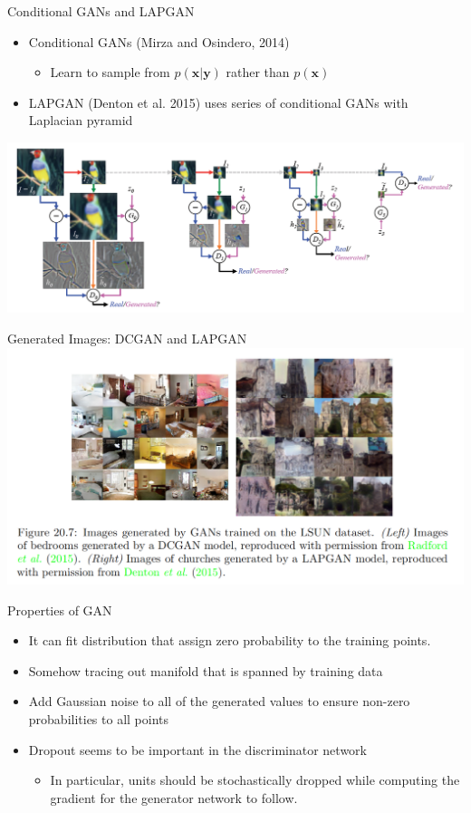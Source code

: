 \documentclass[dvipdfmx,presentation]{beamer}
\def\bf{\mathbf}
\begin{document}
\begin{frame}[label={sec:orgheadline31}]{Conditional GANs and LAPGAN}
\begin{itemize}
\item Conditional GANs (Mirza and Osindero, 2014)
\begin{itemize}
\item Learn to sample from \(p(\bf{x} | \bf{y})\) rather than \(p(\bf{x})\)
\end{itemize}
\item LAPGAN (Denton et al. 2015) uses series of conditional GANs with Laplacian pyramid
\end{itemize}
\centering
\includegraphics[width=\textwidth]{./figure/denton2015fig2.png}
\end{frame}

\begin{frame}[label={sec:orgheadline32}]{Generated Images: DCGAN and LAPGAN}
\centering
\includegraphics[width=1.0\textwidth]{./figure/dlbook_fig20_7.png}
\end{frame}

\begin{frame}[label={sec:orgheadline33}]{Properties of GAN}
\begin{itemize}
\item It can fit distribution that assign zero probability to the training points.
\item Somehow tracing out manifold that is spanned by training data
\item Add Gaussian noise to all of the generated values to ensure non-zero probabilities to all points
\item Dropout seems to be important in the discriminator network
\begin{itemize}
\item In particular, units should be stochastically dropped while computing the gradient for the generator network to follow.
\end{itemize}
\end{itemize}
\end{frame}
\end{document}
